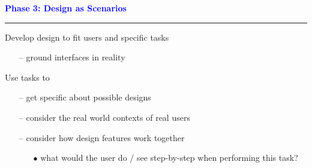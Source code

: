 \documentclass[pdf]{beamer}
\begin{document}
{
\begin{frame}
	\vspace{8mm}
	\textcolor{Blue}{\textbf{\Large{Phase 3: Design as Scenarios}}}
    \textcolor{red}{\rule{10cm}{1mm}}


    \bigskip
     Develop design to fit users and specific tasks
        \begin{itemize}

        \item[{--}] ground interfaces in reality

        \end{itemize}

    \bigskip
     Use tasks to
        \begin{itemize}
        \item[{--}] get specific about possible designs
        \item[{--}] consider the real world contexts of real users
        \item[{--}] consider how design features work together
            \begin{itemize}
                \item[{$\bullet$}] what would the user do / see step-by-step when performing this task?
            \end{itemize}
        \end{itemize}

\end{frame}}
\end{document}
